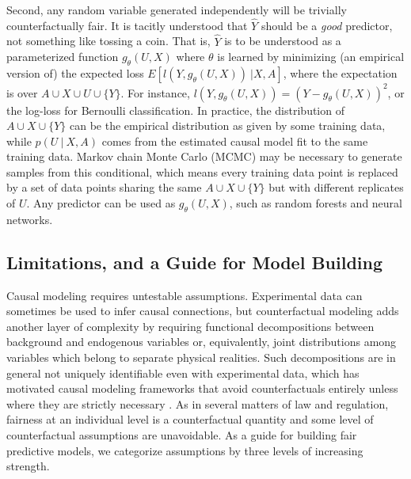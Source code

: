 Second, any random variable generated independently will be trivially counterfactually fair. It is tacitly understood that $\hat Y$ should be a {\it good} predictor, not something like tossing a coin. That is, $\hat Y$ is to be understood as a parameterized function $g_\theta(U, X)$ where $\theta$ is learned by minimizing (an empirical version of) the expected loss $E[l(Y, g_\theta(U, X))\ | X,
  A]$, where the expectation is over $A \cup X \cup U \cup \{Y\}$. For instance, $l(Y, g_\theta(U, X)) = (Y - g_\theta(U, X))^2$, or the log-loss for Bernoulli classification.  In practice, the distribution of $A \cup X \cup \{Y\}$ can be the empirical distribution as given by some training data, while $p(U\ |\ X, A)$ comes from the estimated causal model fit to the same training data. Markov chain Monte Carlo (MCMC) may be necessary to generate samples from this conditional, which means every training data point is replaced by a set of data points sharing the same $A \cup X \cup \{Y\}$ but with different replicates of $U$. Any predictor can be used as $g_\theta(U, X)$, such as random forests and neural networks.

\subsection{Limitations, and a Guide for Model Building}

Causal modeling requires untestable assumptions. Experimental data can sometimes be used to infer causal connections, but counterfactual modeling adds another layer of complexity by requiring functional decompositions between background and endogenous variables or, equivalently, joint distributions among variables which belong to separate physical realities. Such decompositions are in general not uniquely identifiable even with experimental data, which has motivated causal modeling frameworks that avoid counterfactuals entirely unless where they are strictly necessary \citep{dawid:00}. As in several matters of law and regulation, fairness at an individual level is a counterfactual quantity and some level of counterfactual assumptions are unavoidable. As a guide for building fair predictive models, we categorize assumptions by three levels of increasing strength.

